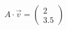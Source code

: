 \documentclass[preview]{standalone}
\begin{document}
\begin{align*}
A \cdot \vec{v} = \begin{pmatrix} 2 \\ 3.5 \end{pmatrix}
\end{align*}
\end{document}
